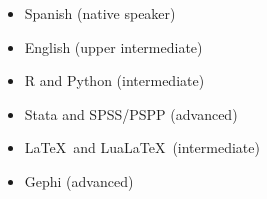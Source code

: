 




\twocolumnsection
{
\begin{itemize}
\vspace{1em}
	\item Spanish (native speaker)
	\item English (upper intermediate)
\end{itemize}}
{
\vspace{1em}
\begin{itemize}
        \item R and Python (intermediate)
	\item Stata and SPSS/PSPP (advanced)
	\item \LaTeX\ and Lua\LaTeX\ (intermediate)
    \item Gephi (advanced)
\end{itemize}
}
\\